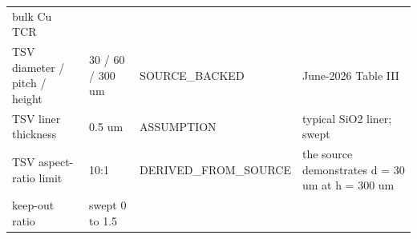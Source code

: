 \documentclass[10pt,]{article}
\begin{document}
\begin{longtable}[]{@{}llll@{}}
\begin{minipage}[t]{0.22\columnwidth}
bulk Cu TCR\strut
\end{minipage}\tabularnewline
\begin{minipage}[t]{0.22\columnwidth}\raggedright
TSV diameter / pitch / height\strut
\end{minipage} & \begin{minipage}[t]{0.22\columnwidth}\raggedright
30 / 60 / 300 um\strut
\end{minipage} & \begin{minipage}[t]{0.22\columnwidth}\raggedright
SOURCE\_BACKED\strut
\end{minipage} & \begin{minipage}[t]{0.22\columnwidth}\raggedright
June-2026 Table III\strut
\end{minipage}\tabularnewline
\begin{minipage}[t]{0.22\columnwidth}\raggedright
TSV liner thickness\strut
\end{minipage} & \begin{minipage}[t]{0.22\columnwidth}\raggedright
0.5 um\strut
\end{minipage} & \begin{minipage}[t]{0.22\columnwidth}\raggedright
ASSUMPTION\strut
\end{minipage} & \begin{minipage}[t]{0.22\columnwidth}\raggedright
typical SiO2 liner; swept\strut
\end{minipage}\tabularnewline
\begin{minipage}[t]{0.22\columnwidth}\raggedright
TSV aspect-ratio limit\strut
\end{minipage} & \begin{minipage}[t]{0.22\columnwidth}\raggedright
10:1\strut
\end{minipage} & \begin{minipage}[t]{0.22\columnwidth}\raggedright
DERIVED\_FROM\_SOURCE\strut
\end{minipage} & \begin{minipage}[t]{0.22\columnwidth}\raggedright
the source demonstrates d = 30 um at h = 300 um\strut
\end{minipage}\tabularnewline
\begin{minipage}[t]{0.22\columnwidth}\raggedright
keep-out ratio\strut
\end{minipage} & \begin{minipage}[t]{0.22\columnwidth}\raggedright
swept 0 to 1.5\strut
\end{minipage} & \begin{minipage}[t]{0.22\columnwidth}\raggedright

\end{minipage}
\end{longtable}
\end{document}
